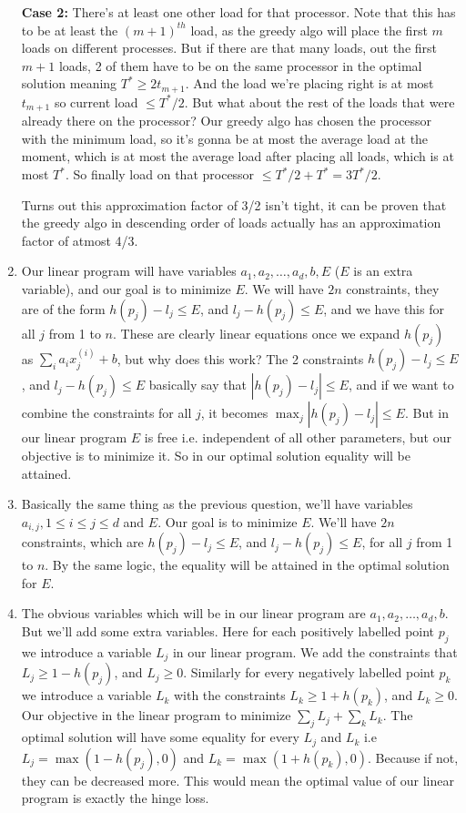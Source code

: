 \documentclass[12pt]{report}
\begin{document}
\begin{enumerate}[label=\textbf{\arabic*.}]
    \textbf{Case 2: }There's at least one other load for that processor. Note that this has to be at least the ${(m+1)}^{th}$ load, as
    the greedy algo will place the first $m$ loads on different processes. But if there are that many loads, out the first $m+1$ loads, 
    2 of them have to be on the same processor in the optimal solution meaning $T^* \geq 2 t_{m+1}$. And the load we're placing right 
    is at most $t_{m+1}$ so current load $\leq T^*/ 2$. But what about the rest of the loads that were already there on the processor? 
    Our greedy algo has chosen the processor with the minimum load, so it's gonna be at most the average load at the moment, which is 
    at most the average load after placing all loads, which is at most $T^*$. So finally load on that processor $\leq T^*/2 + T^* = 
    3T^* / 2$.

    Turns out this approximation factor of 3/2 isn't tight, it can be proven that the greedy algo in descending order of loads actually 
    has an approximation factor of atmost 4/3.

    \item Our linear program will have variables $a_1, a_2, \dots, a_d, b, E$ ($E$ is an extra variable), and our goal is to minimize $E$.
    We will have $2n$ constraints, they are of the form $h(p_j) - l_j \leq E$, and $l_j - h(p_j) \leq E$, and we have this for all $j$ 
    from 1 to $n$. These are clearly linear equations once we expand $h(p_j)$ as $\sum_i a_i x_j^{(i)} + b$, but why does this work?
    The 2 constraints $h(p_j) - l_j \leq E$, and $l_j - h(p_j) \leq E$ basically say that $|h(p_j) - l_j| \leq E$, and if we want to
    combine the constraints for all $j$, it becomes $\max_j |h(p_j) - l_j| \leq E$. But in our linear program $E$ is free i.e.
    independent of all other parameters, but our objective is to minimize it. So in our optimal solution equality will be attained.
    
    \item Basically the same thing as the previous question, we'll have variables $a_{i,j}, 1 \leq i \leq j \leq d$ and $E$. Our goal
    is to minimize $E$. We'll have $2n$ constraints, which are $h(p_j) - l_j \leq E$, and $l_j - h(p_j) \leq E$, for all $j$ from 1 to 
    $n$. By the same logic, the equality will be attained in the optimal solution for $E$. 

    \item The obvious variables which will be in our linear program are $a_1, a_2, \dots, a_d, b$. But we'll add some extra variables.
    Here for each positively labelled point $p_j$ we introduce a variable $L_j$ in our linear program. We add the constraints that 
    $L_j \geq 1 - h(p_j)$, and $L_j \geq 0$. Similarly for every negatively labelled point $p_k$ we introduce a variable $L_k$ with 
    the constraints $L_k \geq 1 + h(p_k)$, and $L_k \geq 0$. Our objective in the linear program to minimize $\sum_j L_j + \sum_k L_k$.
    The optimal solution will have some equality for every $L_j$ and $L_k$ i.e $L_j = \max(1 - h(p_j), 0)$ and $L_k = \max(1 + h(p_k), 0)$.
    Because if not, they can be decreased more. This would mean the optimal value of our linear program is exactly the hinge loss.
    

\end{enumerate}
\end{document}

